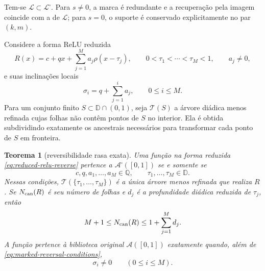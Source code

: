 \documentclass[11pt,a4paper]{article}
\newtheorem{theorem}{Teorema}[section]
\theoremstyle{definition}
\theoremstyle{remark}
\newcommand{\Aclass}{\mathcal{A}}
\newcommand{\Library}{\mathcal{L}}
\begin{document}
Tem-se $\Library\subset\Library^\square$. Para $s\ne0$, a marca é redundante
e a recuperação pela imagem coincide com a de $\Library$; para $s=0$, o
suporte é conservado explicitamente no par $(k,m)$.

Considere a forma ReLU reduzida
\begin{equation}
 R(x)=c+qx+\sum_{j=1}^{M}a_j\rho(x-\tau_j),
 \qquad 0<\tau_1<\cdots<\tau_M<1,
 \qquad a_j\ne0,
 \label{eq:reduced-relu-reverse}
\end{equation}
e suas inclinações locais
\begin{equation}
 \sigma_i=q+\sum_{j=1}^{i}a_j,
 \qquad 0\le i\le M.
 \label{eq:reverse-local-slopes}
\end{equation}
Para um conjunto finito $S\subset\mathbb D\cap(0,1)$, seja
$\mathcal T(S)$ a árvore diádica menos refinada cujas folhas não contêm
pontos de $S$ no interior. Ela é obtida subdividindo exatamente os ancestrais
necessários para transformar cada ponto de $S$ em fronteira.

\begin{theorem}[reversibilidade rasa exata]
\label{thm:exact-marked-reversal}
Uma função na forma reduzida \eqref{eq:reduced-relu-reverse} pertence a
$\Aclass^\square([0,1])$ se e somente se
\begin{equation}
 c,q,a_1,\ldots,a_M\in\mathbb Q,
 \qquad
 \tau_1,\ldots,\tau_M\in\mathbb D.
 \label{eq:marked-reversal-conditions}
\end{equation}
Nessas condições, $\mathcal T(\{\tau_1,\ldots,\tau_M\})$ é a única árvore
menos refinada que realiza $R$. Se $N_{\rm can}(R)$ é seu número de folhas e
$d_j$ é a profundidade diádica reduzida de $\tau_j$, então
\begin{equation}
 M+1\le N_{\rm can}(R)
 \le 1+\sum_{j=1}^{M}d_j.
 \label{eq:canonical-tree-leaf-bounds}
\end{equation}
A função pertence à biblioteca original $\Aclass([0,1])$ exatamente quando,
além de \eqref{eq:marked-reversal-conditions},
\begin{equation}
 \sigma_i\ne0\qquad(0\le i\le M).
 \label{eq:original-nonflat-condition}
\end{equation}
\end{theorem}
\end{document}

